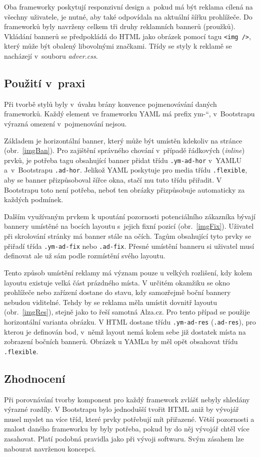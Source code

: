 \documentclass[thesis=B,czech]{FITthesis}[2012/06/26]
\begin{document}
Oba frameworky poskytují responzivní design a~pokud má být reklama cílená na všechny uživatele, je nutné, aby také odpovídala na aktuální šířku prohlížeče. Do frameworků byly navrženy celkem tři druhy reklamních bannerů (proužků). Vkládání bannerů se předpokládá do HTML jako obrázek pomocí tagu \verb#<img />#, který může být obalený libovolnými značkami. Třídy se styly k reklamě se nacházejí v~souboru \textit{adver.css}.

\subsection{Použití v~praxi}
Při tvorbě stylů byly v~úvahu brány konvence pojmenovávání daných frameworků. Každý element ve frameworku YAML má prefix \quotedblbase ym-\textquotedblleft , v~Bootstrapu výrazná omezení v~pojmenování nejsou. 

Základem je horizontální banner, který může být umístěn kdekoliv na stránce (obr.~\ref{imgBan}). Pro zajištění správného chování v~případě řádkových (\textit{inline}) prvků, je potřeba tagu obsahující banner přidat třídu \verb#.ym-ad-hor# v~YAMLU a~v~Bootstrapu \verb#.ad-hor#. Jelikož YAML poskytuje pro media třídu \verb#.flexible#, aby se banner přizpůsoboval šířce okna, stačí mu tuto třídu přiřadit. V Bootstrapu toto není potřeba, neboť ten obrázky přizpůsobuje automaticky za každých podmínek.



Dalším využívaným prvkem k upoutání pozornosti potenciálního zákazníka bývají bannery umístěné na bocích layoutu s~jejich fixní pozicí (obr.~\ref{imgFix}). Uživatel při skrolování stránky má banner stále na očích. Tagům obsahující tyto prvky se přiřadí třída \verb#.ym-ad-fix# nebo \verb#.ad-fix#. Přesné umístění banneru si uživatel musí definovat ale už sám podle rozmístění svého layoutu. 


Tento způsob umístění reklamy má význam pouze u velkých rozlišení, kdy kolem layoutu existuje velká část prázdného místa. V určitém okamžiku se okno prohlížeče nebo zařízení dostane do stavu, kdy samozřejmě boční bannery nebudou viditelné. Tehdy by se reklama měla umístit dovnitř layoutu (obr.~\ref{imgRes}), stejně jako to řeší samotná Alza.cz. Pro tento případ se použije horizontální varianta obrázku. V HTML dostane třídu \verb#.ym-ad-res# (\verb#.ad-res#), pro kterou je definován bod, v~němž layout nemá kolem sebe již dostatek místa na zobrazení bočních bannerů. Obrázek u YAMLu by měl opět obsahovat třídu \verb#.flexible#.

\subsection{Zhodnocení}
Při porovnávání tvorby komponent pro každý framework zvlášť nebyly shledány výrazné rozdíly. V Bootstrapu bylo jednodušší tvořit HTML aniž by vývojář musel myslet na více tříd, které prvky potřebují mít přiřazené. Větší pozornosti a znalost daného frameworku by byly potřeba, pokud by do něj vývojář chtěl více zasahovat. Platí podobná pravidla jako při vývoji softwaru. Svým zásahem lze nabourat navrženou koncepci.
\end{document}
